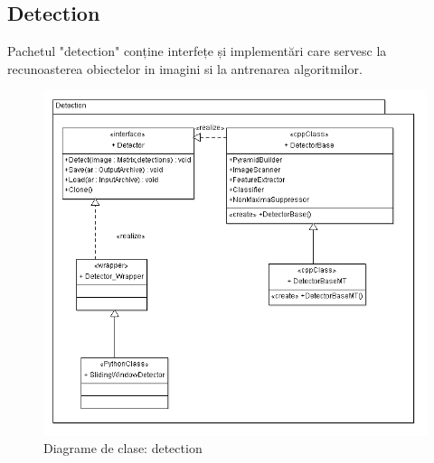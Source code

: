 \subsection{Detection}
Pachetul "detection" conține interfețe și implementări care servesc la recunoasterea obiectelor in imagini si la antrenarea algoritmilor.
\begin{figure}[H]
	\centering
		\includegraphics[width=1.00\textwidth]{uml/detectionClassDiagram.png}
	\caption{Diagrame de clase: detection}
	\label{fig:detectionClassDiagram}
\end{figure}

